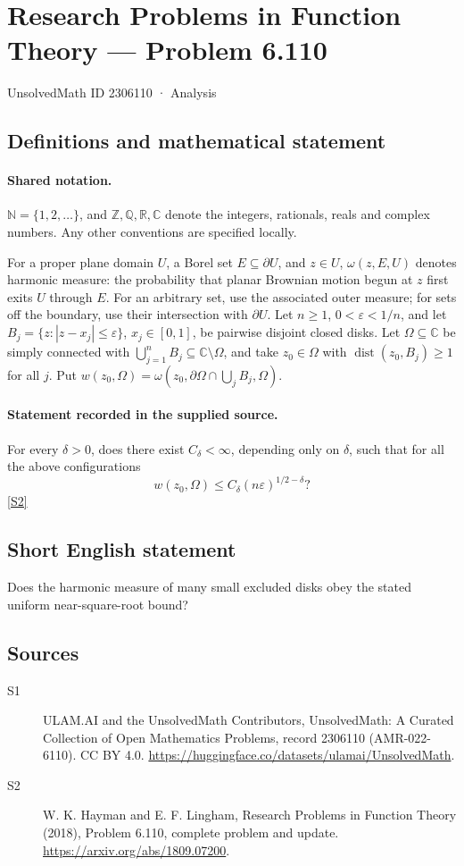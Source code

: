 \documentclass[11pt]{article}
\newcommand{\sref}[2]{\hyperlink{source:#1:#2}{[S#2]}}
\begin{document}
\setcounter{section}{2306109}
\section{Research Problems in Function Theory — Problem 6.110}\label{2306110}
{\small\sffamily UnsolvedMath ID 2306110 · Analysis}
\subsection{Definitions and mathematical statement}

\paragraph{Shared notation.}$\mathbb N=\{1,2,\ldots\}$, and $\mathbb Z,\mathbb Q,\mathbb R,\mathbb C$ denote the integers, rationals, reals and complex numbers. Any other conventions are specified locally.


For a proper plane domain $U$, a Borel set $E\subseteq\partial U$, and $z\in U$, $\omega(z,E,U)$ denotes harmonic measure: the probability that planar Brownian motion begun at $z$ first exits $U$ through $E$. For an arbitrary set, use the associated outer measure; for sets off the boundary, use their intersection with $\partial U$.
Let $n\geq1$, $0<\varepsilon<1/n$, and let $B_j=\{z:|z-x_j|\leq\varepsilon\}$, $x_j\in[0,1]$, be pairwise disjoint closed disks. Let $\Omega\subseteq\mathbb C$ be simply connected with $\bigcup_{j=1}^nB_j\subseteq\mathbb C\setminus\Omega$, and take $z_0\in\Omega$ with $\operatorname{dist}(z_0,B_j)\geq1$ for all $j$. Put $w(z_0,\Omega)=\omega(z_0,\partial\Omega\cap\bigcup_j B_j,\Omega)$.
\paragraph{Statement recorded in the supplied source.}
For every $\delta>0$, does there exist $C_\delta<\infty$, depending only on $\delta$, such that for all the above configurations
\[w(z_0,\Omega)\leq C_\delta(n\varepsilon)^{1/2-\delta}?\] \sref{2306110}{2}
\subsection{Short English statement}
Does the harmonic measure of many small excluded disks obey the stated uniform near-square-root bound?
\subsection{Sources}
\begin{description}
\item[\hypertarget{source:2306110:1}{S1}] ULAM.AI and the UnsolvedMath Contributors, UnsolvedMath: A Curated Collection of Open Mathematics Problems, record 2306110 (AMR-022-6110). CC BY 4.0. \url{https://huggingface.co/datasets/ulamai/UnsolvedMath}.
\item[\hypertarget{source:2306110:2}{S2}] W. K. Hayman and E. F. Lingham, Research Problems in Function Theory (2018), Problem 6.110, complete problem and update. \url{https://arxiv.org/abs/1809.07200}.
\end{description}
\label{end:2306110}
\end{document}
